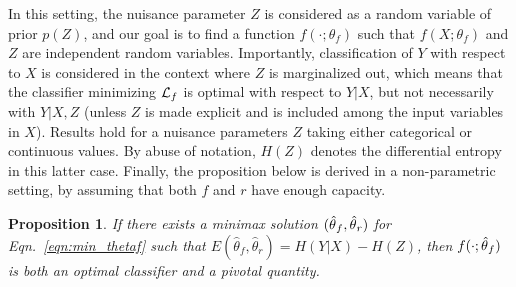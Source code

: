\documentclass{article}
\theoremstyle{plain}
\newtheorem{proposition}[theorem]{Proposition}
\begin{document}
In this setting, the nuisance parameter $Z$ is considered as a random variable
of prior $p(Z)$, and our goal is to find a function
$f(\cdot;\theta_f)$ such that $f(X;\theta_f)$ and $Z$ are independent random
variables.   Importantly, classification of $Y$ with respect to $X$ is
considered in the context where $Z$ is marginalized out, which means that the
classifier minimizing ${\cal L}_f$ is optimal with respect to $Y|X$, but not
necessarily with $Y|X,Z$ (unless $Z$ is made explicit and is included among the
input variables in $X$). Results hold for a nuisance parameters $Z$ taking either
categorical or continuous values. By abuse of notation, $H(Z)$ denotes the
differential entropy in this latter case. Finally, the  proposition below is
derived in a non-parametric setting, by assuming that both $f$ and $r$ have
enough capacity.

\begin{proposition}\label{prop:2}
If there exists a minimax solution $(\smash{\hat\theta}_f, \smash{\hat\theta}_r)$
for Eqn.~\ref{eqn:min_thetaf} such that
$E(\hat\theta_f, \hat\theta_r) = H({Y|X}) - H(Z)$, then
$f(\cdot;\smash{\hat\theta}_f)$ is both an optimal classifier and a pivotal
quantity.
\end{proposition}
\end{document}
